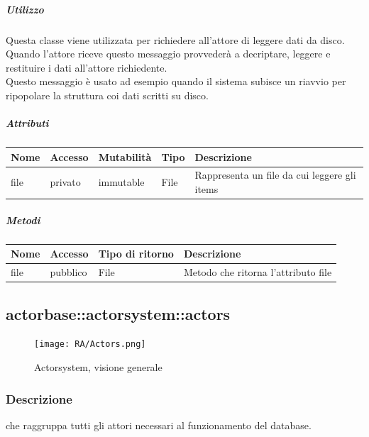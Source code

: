 \documentclass{scalatekids-article}
\begin{document}
\subparagraph{Utilizzo}
Questa classe viene utilizzata per richiedere all'attore di leggere dati
da disco. Quando l'attore riceve questo messaggio provvederà a decriptare,
leggere e restituire i dati all'attore richiedente.\\Questo messaggio è usato ad esempio quando il sistema subisce un riavvio per ripopolare la struttura coi dati scritti su disco.

\subparagraph{Attributi}
\begin{tabular}{| p{2cm} | p{1.5cm} | p{2cm} | p{3cm} | p{8.5cm} |}
  \hline
  Nome & Accesso & Mutabilità & Tipo & Descrizione\\
  \hline
  file & privato & immutable & File & Rappresenta un file da cui leggere gli items\\
  \hline
\end{tabular}

\subparagraph{Metodi}
\begin{tabular}{| l | l | l | l |}
  \hline
  Nome & Accesso & Tipo di ritorno & Descrizione\\
  \hline
  file & pubblico & File & Metodo che ritorna l'attributo file\\
  \hline
\end{tabular}


\subsection{actorbase::actorsystem::actors} %
\label{sec:actorbase::actorsystem::actors}

\begin{figure}[H]
  \begin{center}
    \texttt{[image: RA/Actors.png]}
    \caption{Actorsystem, visione generale}
  \end{center}
\end{figure}

\subsubsection{Descrizione}

 che raggruppa tutti gli attori necessari al funzionamento del database.
\end{document}
